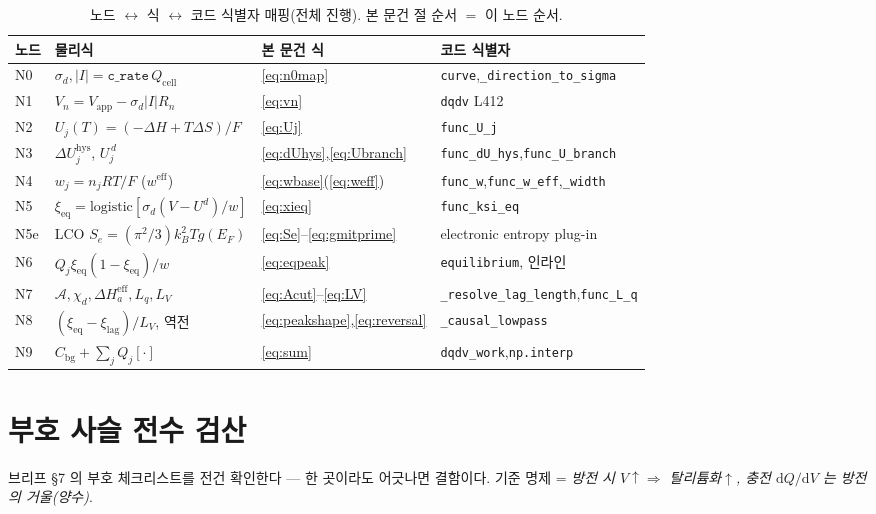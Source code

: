 \documentclass[11pt,a4paper]{article}
\newcommand{\dd}{\mathrm{d}}
\newcommand{\eff}{\mathrm{eff}}
\newcommand{\eq}{\mathrm{eq}}
\newcommand{\app}{\mathrm{app}}
\newcommand{\cell}{\mathrm{cell}}
\newcommand{\bg}{\mathrm{bg}}
\newcommand{\hys}{\mathrm{hys}}
\newcommand{\code}[1]{\texttt{#1}}
\begin{document}
\begin{table}[t]
\centering
\renewcommand{\arraystretch}{1.3}
\caption{노드 $\leftrightarrow$ 식 $\leftrightarrow$ 코드 식별자 매핑(전체 진행). 본 문건 절 순서 $=$ 이 노드 순서.}
\label{tab:nodemap}
\begin{tabular}{l l l l}
\toprule
노드 & 물리식 & 본 문건 식 & 코드 식별자 \\
\midrule
N0 & $\sigma_d,|I|=\code{c\_rate}\,Q_\cell$ & \eqref{eq:n0map} & \code{curve},\code{\_direction\_to\_sigma} \\
N1 & $V_n=V_\app-\sigma_d|I|R_n$ & \eqref{eq:vn} & \code{dqdv} L412 \\
N2 & $U_j(T)=(-\Delta H+T\Delta S)/F$ & \eqref{eq:Uj} & \code{func\_U\_j} \\
N3 & $\Delta U_j^\hys$, $U_j^{\,d}$ & \eqref{eq:dUhys},\eqref{eq:Ubranch} & \code{func\_dU\_hys},\code{func\_U\_branch} \\
N4 & $w_j=n_jRT/F$ ($w^\eff$) & \eqref{eq:wbase}(\eqref{eq:weff}) & \code{func\_w},\code{func\_w\_eff},\code{\_width} \\
N5 & $\xi_\eq=\mathrm{logistic}[\sigma_d(V-U^d)/w]$ & \eqref{eq:xieq} & \code{func\_ksi\_eq} \\
N5e & LCO $S_e=(\pi^2/3)k_B^2Tg(E_F)$ & \eqref{eq:Se}--\eqref{eq:gmitprime} & electronic entropy plug-in \\
N6 & $Q_j\xi_\eq(1-\xi_\eq)/w$ & \eqref{eq:eqpeak} & \code{equilibrium}, 인라인 \\
N7 & $\mathcal A,\chi_d,\Delta H_a^\eff,L_q,L_V$ & \eqref{eq:Acut}--\eqref{eq:LV} & \code{\_resolve\_lag\_length},\code{func\_L\_q} \\
N8 & $(\xi_\eq-\xi_\mathrm{lag})/L_V$, 역전 & \eqref{eq:peakshape},\eqref{eq:reversal} & \code{\_causal\_lowpass} \\
N9 & $C_\bg+\sum_jQ_j[\cdot]$ & \eqref{eq:sum} & \code{dqdv\_work},\code{np.interp} \\
\bottomrule
\end{tabular}
\end{table}

\section{부호 사슬 전수 검산}\label{sec:signcheck}
브리프 §7 의 부호 체크리스트를 전건 확인한다 — 한 곳이라도 어긋나면 결함이다. 기준 명제 = \emph{방전 시
$V\!\uparrow\Rightarrow$ 탈리튬화$\uparrow$, 충전 $\dd Q/\dd V$ 는 방전의 거울(양수)}.
\end{document}
